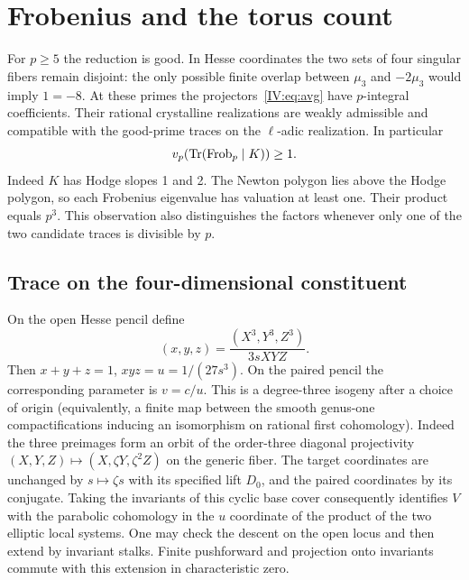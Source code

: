 \documentclass[11pt,letterpaper]{article}
\theoremstyle{definition}
\theoremstyle{remark}
\begin{document}
\section{Frobenius and the torus count}\label{IV:app:torus}
For $p\geq5$ the reduction is good. In Hesse coordinates the two
sets of four singular fibers remain disjoint: the only possible finite
overlap between $\mu_3$ and $-2\mu_3$ would imply $1=-8$.
At these primes the projectors~\eqref{IV:eq:avg} have $p$-integral
coefficients. Their rational crystalline realizations are weakly
admissible and compatible with the good-prime traces on the
$\ell$-adic realization. In particular
\begin{equation}\label{IV:eq:slopes}
 v_p(\operatorname{Tr}(\operatorname{Frob}_p\mid K))\geq1 .
\end{equation}
Indeed $K$ has Hodge slopes 1 and 2. The Newton polygon lies above
the Hodge polygon, so each Frobenius eigenvalue has valuation at least
one. Their product equals $p^3$. This observation also distinguishes
the factors whenever only one of the two candidate traces is divisible
by $p$.


\subsection{Trace on the four-dimensional constituent}
On the open Hesse pencil define
\[
 (x,y,z)=\frac{(X^3,Y^3,Z^3)}{3sXYZ}.
\]
Then $x+y+z=1$, $xyz=u=1/(27s^3)$. On the paired pencil the
corresponding parameter is $v=c/u$. This is a degree-three isogeny
after a choice of origin (equivalently, a finite map between the
smooth genus-one compactifications inducing an isomorphism on
rational first cohomology). Indeed the three preimages form an orbit
of the order-three diagonal projectivity
$(X,Y,Z)\mapsto (X,\zeta Y,\zeta^2Z)$ on the generic fiber.
The target coordinates are unchanged by $s\mapsto\zeta s$ with its
specified lift $D_0$, and the paired coordinates by its conjugate.
Taking the invariants of this cyclic base cover consequently identifies
$V$ with the parabolic cohomology in the $u$ coordinate of the
product of the two elliptic local systems. One may check the descent
on the open locus and then extend by invariant stalks. Finite
pushforward and projection onto invariants commute with this
extension in characteristic zero.
\end{document}
